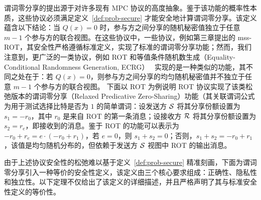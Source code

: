 谓词零分享的提出源于对许多现有 MPC 协议的高度抽象。鉴于该功能的概率性本质，这些协议必须满足定义~\ref{def:prob-secure} 才能安全地计算谓词零分享。该定义蕴含以下结论：当 $Q(x) = 0$ 时，参与方之间分享的随机秘密值独立于任意 $m-1$ 个参与方的联合视图。在这些协议中，一些协议，例如第三章提出的 mss-ROT，其安全性严格遵循标准定义，实现了标准的谓词零分享功能；然而，我们注意到，更广泛的一类协议，例如 ROT 和等值条件随机数生成（Equality-Conditional Randomness Generation, ECRG）~\cite{Jia0ZG24} 实现的是一种类似的功能，其不同之处在于：若 $Q(x) = 0$，则参与方之间分享的均匀随机秘密值并不独立于任意 $m-1$ 个参与方的联合视图。
下面以 ROT 为例说明 ROT 协议实现了该类松弛版本的谓词零分享（Relaxed Predicative Zero-Sharing）功能（其关联谓词公式为用于测试选择比特是否为 $1$ 的简单谓词：设发送方 $\mathcal{S}$ 将其分享份额设置为 $s_1 = -r_0$，其中 $r_0$ 是来自 ROT 的第一条消息；设接收方 $\mathcal{R}$ 将其分享份额设置为 $s_2 = r_e$，即接收到的消息。鉴于 ROT 的功能可以表示为 $-r_0 + r_e = e \cdot (-r_0 + r_1)$，若 $e = 0$，则 $s_1 + s_2 = 0$；否则，$s_1 + s_2 = -r_0 + r_1$，该值是均匀随机分布的，但依赖于发送方 $\mathcal{S}$ 视图中 ROT 的输出消息。

由于上述协议安全性的松弛难以基于定义~\ref{def:prob-secure} 精准刻画，下面为谓词零分享引入一种等价的安全性定义，该定义由三个核心要求组成：正确性、隐私性和独立性。以下定理不仅给出了该定义的详细描述，并且严格声明了其与标准安全性定义的等价性。

